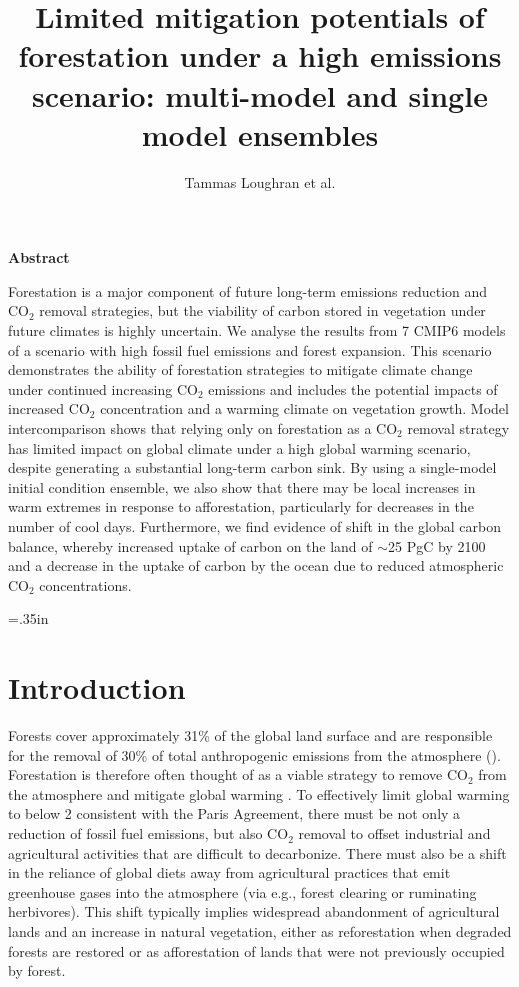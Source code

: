 \documentclass[]{article}
\title{Limited mitigation potentials of forestation under a high emissions scenario: multi-model and single model ensembles}
\author{Tammas Loughran et al.}
\begin{document}
\maketitle

\begin{center}
    \Large
    \vspace{0.9cm}
    \textbf{Abstract}
\end{center}

Forestation is a major component of future long-term emissions reduction and CO$_2$ removal strategies, but the viability of carbon stored in vegetation under future climates is highly uncertain.
We analyse the results from 7 CMIP6 models of a scenario with high fossil fuel emissions and forest expansion.
This scenario demonstrates the ability of forestation strategies to mitigate climate change under continued increasing CO$_2$ emissions and includes the potential impacts of increased CO$_2$ concentration and a warming climate on vegetation growth.
Model intercomparison shows that relying only on forestation as a CO$_2$ removal strategy has limited impact on global climate under a high global warming scenario, despite generating a substantial long-term carbon sink.
By using a single-model initial condition ensemble, we also show that there may be local increases in warm extremes in response to afforestation, particularly for decreases in the number of cool days.
Furthermore, we find evidence of shift in the global carbon balance, whereby increased uptake of carbon on the land of $\sim$25 PgC by 2100 and a decrease in the uptake of carbon by the ocean due to reduced atmospheric CO$_2$ concentrations.

\raggedright
\parindent=.35in %

\section{Introduction}

Forests cover approximately 31\% of the global land surface \parencite{fao_global_2020} and are responsible for the removal of 30\% of total anthropogenic emissions from the atmosphere (\cite{friedlingstein_global_2022}).
Forestation is therefore often thought of as a viable strategy to remove CO$_2$ from the atmosphere and mitigate global warming \parencite{smith_long-term_2022}.
To effectively limit global warming to below 2 \textcelsius{} consistent with the Paris Agreement, there must be not only a reduction of fossil fuel emissions, but also CO$_2$ removal to offset industrial and agricultural activities that are difficult to decarbonize.
There must also be a shift in the reliance of global diets away from agricultural practices that emit greenhouse gases into the atmosphere (via e.g., forest clearing or ruminating herbivores).
This shift typically implies widespread abandonment of agricultural lands and an increase in natural vegetation, either as reforestation when degraded forests are restored or as afforestation of lands that were not previously occupied by forest.
\end{document}
